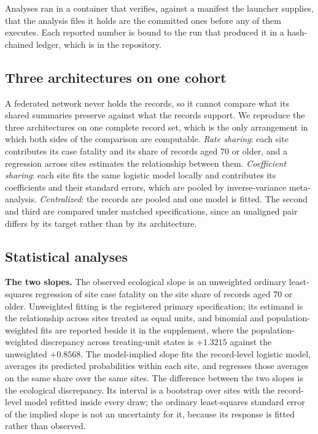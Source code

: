 \documentclass[11pt]{article}
\begin{document}
Analyses ran in a container that verifies, against a manifest the
launcher supplies, that the analysis files it holds are the committed
ones before any of them executes.  Each reported number is bound to the
run that produced it in a hash-chained ledger, which is in the
repository.

\subsection{Three architectures on one cohort}

A federated network never holds the records, so it cannot compare what
its shared summaries preserve against what the records support.  We
reproduce the three architectures on one complete record set, which is
the only arrangement in which both sides of the comparison are
computable.  \emph{Rate sharing}: each site contributes its case
fatality and its share of records aged 70 or older, and a regression
across sites estimates the relationship between them.  \emph{Coefficient
sharing}: each site fits the same logistic model locally and contributes
its coefficients and their standard errors, which are pooled by
inverse-variance meta-analysis.  \emph{Centralized}: the records are
pooled and one model is fitted.  The second and third are compared under
matched specifications, since an unaligned pair differs by its target
rather than by its architecture.

\subsection{Statistical analyses}

\textbf{The two slopes.}  The observed ecological slope is an unweighted
ordinary least-squares regression of site case fatality on the site
share of records aged 70 or older.  Unweighted fitting is the
registered primary specification; its estimand is the relationship
across sites treated as equal units, and binomial and
population-weighted fits are reported beside it in the supplement, where
the population-weighted discrepancy across treating-unit states is
$+1.3215$ against the unweighted $+0.8568$.  The model-implied slope fits the record-level logistic
model, averages its predicted probabilities within each site, and
regresses those averages on the same share over the same sites.  The
difference between the two slopes is the ecological discrepancy.  Its
interval is a bootstrap over sites with the record-level model refitted
inside every draw; the ordinary least-squares standard error of the
implied slope is not an uncertainty for it, because its response is
fitted rather than observed.
\end{document}
